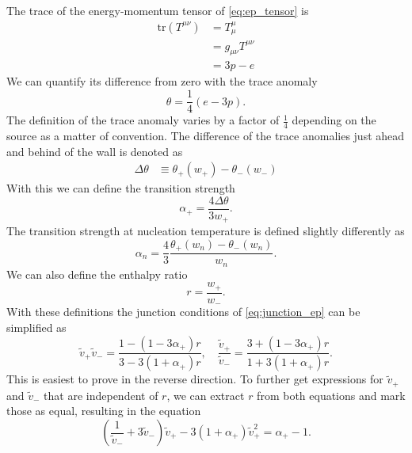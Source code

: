 The trace of the energy-momentum tensor of \eqref{eq:ep_tensor} is
\begin{align}
\text{tr} (T^{\mu \nu})
&= T^\mu_\mu \\
&= g_{\mu \nu} T^{\mu \nu} \\
&=3p - e
\end{align}
We can quantify its difference from zero with the trace anomaly
\cites[eq. 7.24]{lecture_notes}[eq. 28]{giese_2020}
\begin{equation}
\theta = \frac{1}{4}(e-3p).
\end{equation}
The definition of the trace anomaly varies by a factor of $\frac{1}{4}$ depending on the source as a matter of convention.
The difference of the trace anomalies just ahead and behind of the wall is denoted as
\begin{align}
\Delta \theta
&\equiv \theta_+(w_+) - \theta_-(w_-) %
\end{align}
With this we can define the transition strength
\begin{equation}
\alpha_+ = \frac{4 \Delta \theta}{3 w_+}.
\end{equation}
The transition strength at nucleation temperature is defined slightly differently as
\cite[eq. 2.11]{hindmarsh_gw_pt_2019}
\begin{equation}
\alpha_n = \frac{4}{3} \frac{\theta_+(w_n) - \theta_-(w_n)}{w_n}.
\end{equation}
We can also define the enthalpy ratio
\begin{equation}
r = \frac{w_+}{w_-}.
\end{equation}
With these definitions the junction conditions of \eqref{eq:junction_ep} can be simplified as
\begin{equation}
\tilde{v}_+ \tilde{v}_- = \frac{1-(1-3\alpha_+)r}{3-3(1+\alpha_+)r},
\quad
\frac{\tilde{v}_+}{\tilde{v}_-} = \frac{3+(1-3\alpha_+)r}{1+3(1+\alpha_+)r}.
\end{equation}
This is easiest to prove in the reverse direction.
To further get expressions for $\tilde{v}_+$ and $\tilde{v}_-$ that are independent of $r$, we can extract $r$ from both equations and mark those as equal, resulting in the equation
\begin{equation}
\left( \frac{1}{\tilde{v}_-} + 3 \tilde{v}_- \right) \tilde{v}_+ - 3(1+\alpha_+)\tilde{v}_+^2 = \alpha_+ - 1.
\end{equation}

